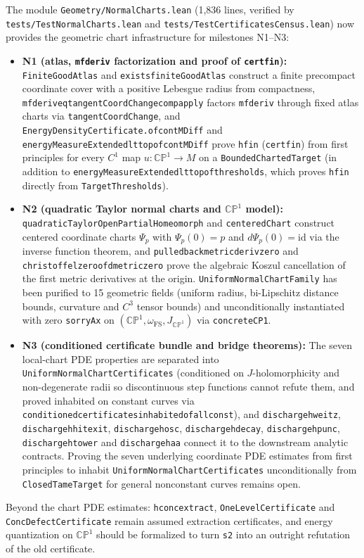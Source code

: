 \documentclass[11pt]{article}
\renewcommand{\_}{\origus\allowbreak}
\newcommand{\CP}{\mathbb{CP}^1}
\newcommand{\code}[1]{\texttt{#1}}
\begin{document}
The module \code{Geometry/NormalCharts.lean} (1{,}836 lines, verified by
\code{tests/TestNormalCharts.lean} and \code{tests/TestCertificatesCensus.lean}) now provides the
geometric chart infrastructure for milestones N1--N3:
\begin{itemize}
\item \textbf{N1 (atlas, \code{mfderiv} factorization and proof of \code{cert\_fin}):}
  \code{FiniteGoodAtlas} and \code{exists\_finiteGoodAtlas} construct a finite precompact coordinate
  cover with a positive Lebesgue radius from compactness,
  \code{mfderiv\_eq\_tangentCoordChange\_comp\_apply} factors \code{mfderiv} through fixed atlas
  charts via \code{tangentCoordChange}, and \code{EnergyDensityCertificate.of\_contMDiff} and
  \code{energyMeasureExtended\_lt\_top\_of\_contMDiff} prove \code{h\_fin} (\code{cert\_fin}) from
  first principles for every $C^1$ map $u:\CP\to M$ on a \code{BoundedChartedTarget} (in addition to
  \code{energyMeasureExtended\_lt\_top\_of\_thresholds}, which proves \code{h\_fin} directly from
  \code{TargetThresholds}).
\item \textbf{N2 (quadratic Taylor normal charts and $\CP$ model):}
  \code{quadraticTaylorOpenPartialHomeomorph} and \code{centeredChart} construct centered coordinate
  charts $\Psi_p$ with $\Psi_p(0)=p$ and $d\Psi_p(0)=\mathrm{id}$ via the inverse function theorem,
  and \code{pulled\_back\_metric\_deriv\_zero} and \code{christoffel\_zero\_of\_dmetric\_zero} prove
  the algebraic Koszul cancellation of the first metric derivatives at the origin.
  \code{UniformNormalChartFamily} has been purified to 15 geometric fields (uniform radius,
  bi-Lipschitz distance bounds, curvature and $C^3$ tensor bounds) and unconditionally instantiated
  with zero \code{sorryAx} on $(\CP,\omega_{\mathrm{FS}},J_{\CP})$ via \code{concrete\_CP1}.
\item \textbf{N3 (conditioned certificate bundle and bridge theorems):} The seven local-chart PDE
  properties are separated into \code{UniformNormalChartCertificates} (conditioned on
  $J$-holomorphicity and non-degenerate radii so discontinuous step functions cannot refute them, and
  proved inhabited on constant curves via \code{conditioned\_certificates\_inhabited\_of\_all\_const}),
  and \code{discharge\_h\_weitz}, \code{discharge\_h\_hit\_exit}, \code{discharge\_h\_osc},
  \code{discharge\_h\_decay}, \code{discharge\_h\_punc}, \code{discharge\_h\_tower} and
  \code{discharge\_h\_aa} connect it to the downstream analytic contracts. Proving the seven
  underlying coordinate PDE estimates from first principles to inhabit
  \code{UniformNormalChartCertificates} unconditionally from \code{ClosedTameTarget} for general
  nonconstant curves remains open.
\end{itemize}
Beyond the chart PDE estimates: \code{h\_conc\_extract}, \code{OneLevelCertificate} and
\code{ConcDefectCertificate} remain assumed extraction certificates, and energy quantization on
$\CP$ should be formalized to turn \code{s2} into an outright refutation of the old certificate.
\end{document}
